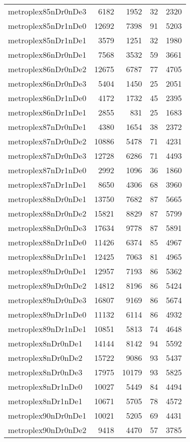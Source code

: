 \documentclass[../../../thesis.tex]{subfiles}
\begin{document}
\begin{longtable}{lrrrr}
metroplex85nDr0nDe3 & 6182 & 1952 & 32 & 2320 \\
metroplex85nDr1nDe0 & 12692 & 7398 & 91 & 5203 \\
metroplex85nDr1nDe1 & 3579 & 1251 & 32 & 1980 \\
metroplex86nDr0nDe1 & 7568 & 3532 & 59 & 3661 \\
metroplex86nDr0nDe2 & 12675 & 6787 & 77 & 4705 \\
metroplex86nDr0nDe3 & 5404 & 1450 & 25 & 2051 \\
metroplex86nDr1nDe0 & 4172 & 1732 & 45 & 2395 \\
metroplex86nDr1nDe1 & 2855 & 831 & 25 & 1683 \\
metroplex87nDr0nDe1 & 4380 & 1654 & 38 & 2372 \\
metroplex87nDr0nDe2 & 10886 & 5478 & 71 & 4231 \\
metroplex87nDr0nDe3 & 12728 & 6286 & 71 & 4493 \\
metroplex87nDr1nDe0 & 2992 & 1096 & 36 & 1860 \\
metroplex87nDr1nDe1 & 8650 & 4306 & 68 & 3960 \\
metroplex88nDr0nDe1 & 13750 & 7682 & 87 & 5665 \\
metroplex88nDr0nDe2 & 15821 & 8829 & 87 & 5799 \\
metroplex88nDr0nDe3 & 17634 & 9778 & 87 & 5891 \\
metroplex88nDr1nDe0 & 11426 & 6374 & 85 & 4967 \\
metroplex88nDr1nDe1 & 12425 & 7063 & 81 & 4965 \\
metroplex89nDr0nDe1 & 12957 & 7193 & 86 & 5362 \\
metroplex89nDr0nDe2 & 14812 & 8196 & 86 & 5424 \\
metroplex89nDr0nDe3 & 16807 & 9169 & 86 & 5674 \\
metroplex89nDr1nDe0 & 11132 & 6114 & 86 & 4932 \\
metroplex89nDr1nDe1 & 10851 & 5813 & 74 & 4648 \\
metroplex8nDr0nDe1 & 14144 & 8142 & 94 & 5592 \\
metroplex8nDr0nDe2 & 15722 & 9086 & 93 & 5437 \\
metroplex8nDr0nDe3 & 17975 & 10179 & 93 & 5825 \\
metroplex8nDr1nDe0 & 10027 & 5449 & 84 & 4494 \\
metroplex8nDr1nDe1 & 10671 & 5705 & 78 & 4572 \\
metroplex90nDr0nDe1 & 10021 & 5205 & 69 & 4431 \\
metroplex90nDr0nDe2 & 9418 & 4470 & 57 & 3785 \\

\end{longtable}
\end{document}
